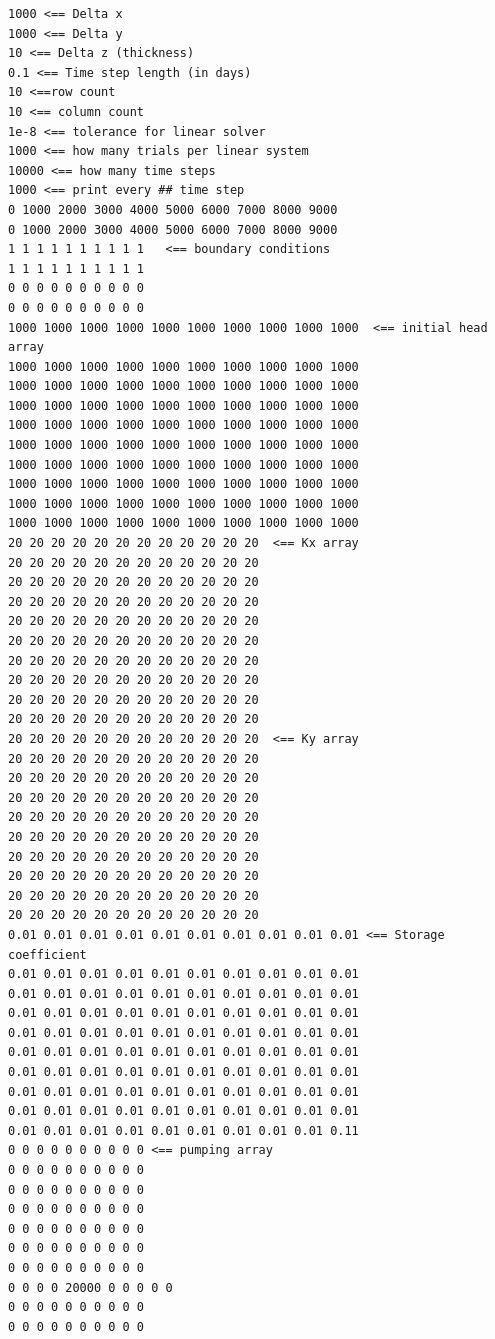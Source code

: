 \begin{lstlisting}[caption= Input file for the Hubbleville Aquifer Example.  Annotations in the listing need to be removed for actual running of the file and are included to illustrate the various parts of the input data , label=lst:HubblevilleInput]
1000 <== Delta x
1000 <== Delta y
10 <== Delta z (thickness)
0.1 <== Time step length (in days)
10 <==row count
10 <== column count
1e-8 <== tolerance for linear solver
1000 <== how many trials per linear system
10000 <== how many time steps
1000 <== print every ## time step
0 1000 2000 3000 4000 5000 6000 7000 8000 9000 
0 1000 2000 3000 4000 5000 6000 7000 8000 9000
1 1 1 1 1 1 1 1 1 1   <== boundary conditions
1 1 1 1 1 1 1 1 1 1
0 0 0 0 0 0 0 0 0 0
0 0 0 0 0 0 0 0 0 0
1000 1000 1000 1000 1000 1000 1000 1000 1000 1000  <== initial head array 
1000 1000 1000 1000 1000 1000 1000 1000 1000 1000 
1000 1000 1000 1000 1000 1000 1000 1000 1000 1000 
1000 1000 1000 1000 1000 1000 1000 1000 1000 1000 
1000 1000 1000 1000 1000 1000 1000 1000 1000 1000 
1000 1000 1000 1000 1000 1000 1000 1000 1000 1000 
1000 1000 1000 1000 1000 1000 1000 1000 1000 1000 
1000 1000 1000 1000 1000 1000 1000 1000 1000 1000 
1000 1000 1000 1000 1000 1000 1000 1000 1000 1000 
1000 1000 1000 1000 1000 1000 1000 1000 1000 1000 
20 20 20 20 20 20 20 20 20 20 20 20  <== Kx array
20 20 20 20 20 20 20 20 20 20 20 20
20 20 20 20 20 20 20 20 20 20 20 20
20 20 20 20 20 20 20 20 20 20 20 20
20 20 20 20 20 20 20 20 20 20 20 20
20 20 20 20 20 20 20 20 20 20 20 20
20 20 20 20 20 20 20 20 20 20 20 20
20 20 20 20 20 20 20 20 20 20 20 20
20 20 20 20 20 20 20 20 20 20 20 20
20 20 20 20 20 20 20 20 20 20 20 20
20 20 20 20 20 20 20 20 20 20 20 20  <== Ky array
20 20 20 20 20 20 20 20 20 20 20 20
20 20 20 20 20 20 20 20 20 20 20 20
20 20 20 20 20 20 20 20 20 20 20 20
20 20 20 20 20 20 20 20 20 20 20 20
20 20 20 20 20 20 20 20 20 20 20 20
20 20 20 20 20 20 20 20 20 20 20 20
20 20 20 20 20 20 20 20 20 20 20 20
20 20 20 20 20 20 20 20 20 20 20 20
20 20 20 20 20 20 20 20 20 20 20 20
0.01 0.01 0.01 0.01 0.01 0.01 0.01 0.01 0.01 0.01 <== Storage coefficient
0.01 0.01 0.01 0.01 0.01 0.01 0.01 0.01 0.01 0.01
0.01 0.01 0.01 0.01 0.01 0.01 0.01 0.01 0.01 0.01
0.01 0.01 0.01 0.01 0.01 0.01 0.01 0.01 0.01 0.01
0.01 0.01 0.01 0.01 0.01 0.01 0.01 0.01 0.01 0.01
0.01 0.01 0.01 0.01 0.01 0.01 0.01 0.01 0.01 0.01
0.01 0.01 0.01 0.01 0.01 0.01 0.01 0.01 0.01 0.01
0.01 0.01 0.01 0.01 0.01 0.01 0.01 0.01 0.01 0.01
0.01 0.01 0.01 0.01 0.01 0.01 0.01 0.01 0.01 0.01
0.01 0.01 0.01 0.01 0.01 0.01 0.01 0.01 0.01 0.11
0 0 0 0 0 0 0 0 0 0 <== pumping array
0 0 0 0 0 0 0 0 0 0
0 0 0 0 0 0 0 0 0 0
0 0 0 0 0 0 0 0 0 0
0 0 0 0 0 0 0 0 0 0
0 0 0 0 0 0 0 0 0 0
0 0 0 0 0 0 0 0 0 0
0 0 0 0 20000 0 0 0 0 0
0 0 0 0 0 0 0 0 0 0
0 0 0 0 0 0 0 0 0 0
\end{lstlisting}

